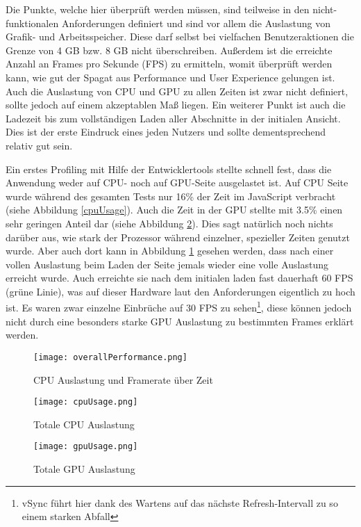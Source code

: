 Die Punkte, welche hier überprüft werden müssen, sind teilweise in den nicht-funktionalen Anforderungen definiert und sind vor allem die Auslastung von Grafik- und Arbeitsspeicher. Diese darf selbst bei vielfachen Benutzeraktionen die Grenze von 4 GB bzw. 8 GB nicht überschreiben. Außerdem ist die erreichte Anzahl an Frames pro Sekunde (FPS) zu ermitteln, womit überprüft werden kann, wie gut der Spagat aus Performance und User Experience gelungen ist. Auch die Auslastung von CPU und GPU zu allen Zeiten ist zwar nicht definiert, sollte jedoch auf einem akzeptablen Maß liegen. Ein weiterer Punkt ist auch die Ladezeit bis zum vollständigen Laden aller Abschnitte in der initialen Ansicht. Dies ist der erste Eindruck eines jeden Nutzers und sollte dementsprechend relativ gut sein. 

Ein erstes Profiling mit Hilfe der Entwicklertools stellte schnell fest, dass die Anwendung weder auf CPU- noch auf GPU-Seite ausgelastet ist. Auf CPU Seite wurde während des gesamten Tests  nur 16\% der Zeit im JavaScript verbracht (siehe Abbildung \ref{cpuUsage}). Auch die Zeit in der GPU stellte mit 3.5\% einen sehr geringen Anteil dar (siehe Abbildung \ref{gpuUsage}). Dies sagt natürlich noch nichts darüber aus, wie stark der Prozessor während einzelner, spezieller Zeiten genutzt wurde. Aber auch dort kann in Abbildung \ref{overallPerformance} gesehen werden, dass nach einer vollen Auslastung beim Laden der Seite jemals wieder eine volle Auslastung erreicht wurde. Auch erreichte sie nach dem initialen laden fast dauerhaft 60 FPS (grüne Linie), was auf dieser Hardware laut den Anforderungen eigentlich zu hoch ist. Es waren zwar einzelne Einbrüche auf 30 FPS zu sehen\footnote{vSync führt hier dank des Wartens auf das nächste Refresh-Intervall zu so einem starken Abfall}, diese können jedoch nicht durch eine besonders starke GPU Auslastung zu bestimmten Frames erklärt werden.

\begin{figure}[H]
  \texttt{[image: overallPerformance.png]}
  \caption{CPU Auslastung und Framerate über Zeit}
  \label{overallPerformance}
\end{figure}

\begin{figure}[H]
  \begin{minipage}{0.5\textwidth}
    \texttt{[image: cpuUsage.png]}
    \caption{Totale CPU Auslastung}
    \label{cpuUsage}
  \end{minipage}
  \begin{minipage}{0.5\textwidth}
    \texttt{[image: gpuUsage.png]}
    \caption{Totale GPU Auslastung}
    \label{gpuUsage}
  \end{minipage}
\end{figure}

